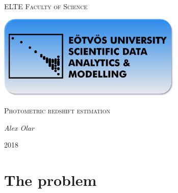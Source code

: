 \documentclass[a4paper,12pt]{article}
\begin{document}
\linespread{1.2}

\begin{titlepage}

	\centering
	{\scshape\LARGE ELTE Faculty of Science\par}
	\vspace{2cm}
	\includegraphics[width=0.66\textwidth]{./dslogo.png}
	\par\vspace{4cm}
	{\scshape\Large Photometric redshift estimation\par}
	\vspace{.5cm}
	{\large\itshape Alex Olar \par}
	\vfill
	{\large 2018 \par}

\end{titlepage}

\onehalfspacing

\begin{abstract}
	\par After reading several papers on the topic I had to reevaluate
	the methods that were used and test their accuracy and reimplement
	the majority of them.
	\par Photometric redshift estimation is a highly popular area and is
	still very important today as a huge portion of the sky is not accurately
	measured or measured at all by spectroscopists so finding the redshift of
	available data and developing a good method and tool to accurately predict
	it would be highly beneficial for all.
	\par My task is to get familiar with these concepts and try to find the
	best among them with machine learning techniques and general clustering
	algorithms.
\end{abstract}

\tableofcontents

\newpage

\section{The problem}
\end{document}
